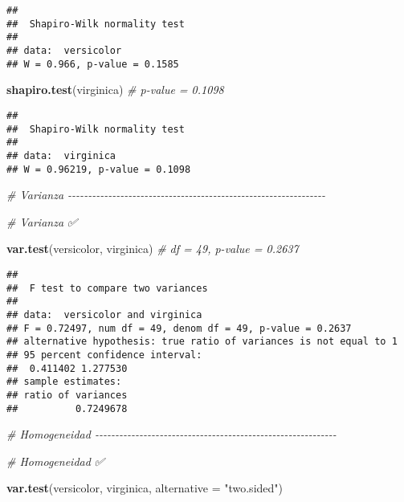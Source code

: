 \documentclass[
]{article}
\newenvironment{Shaded}{\begin{snugshade}}{\end{snugshade}}
\newcommand{\AttributeTok}[1]{\textcolor[rgb]{0.13,0.29,0.53}{#1}}
\newcommand{\CommentTok}[1]{\textcolor[rgb]{0.56,0.35,0.01}{\textit{#1}}}
\newcommand{\FunctionTok}[1]{\textcolor[rgb]{0.13,0.29,0.53}{\textbf{#1}}}
\newcommand{\NormalTok}[1]{#1}
\newcommand{\StringTok}[1]{\textcolor[rgb]{0.31,0.60,0.02}{#1}}
\begin{document}
\begin{verbatim}
## 
##  Shapiro-Wilk normality test
## 
## data:  versicolor
## W = 0.966, p-value = 0.1585
\end{verbatim}

\begin{Shaded}
\begin{Highlighting}[]
\FunctionTok{shapiro.test}\NormalTok{(virginica) }\CommentTok{\#  p{-}value = 0.1098}
\end{Highlighting}
\end{Shaded}

\begin{verbatim}
## 
##  Shapiro-Wilk normality test
## 
## data:  virginica
## W = 0.96219, p-value = 0.1098
\end{verbatim}

\begin{Shaded}
\begin{Highlighting}[]
\CommentTok{\# Varianza {-}{-}{-}{-}{-}{-}{-}{-}{-}{-}{-}{-}{-}{-}{-}{-}{-}{-}{-}{-}{-}{-}{-}{-}{-}{-}{-}{-}{-}{-}{-}{-}{-}{-}{-}{-}{-}{-}{-}{-}{-}{-}{-}{-}{-}{-}{-}{-}{-}{-}{-}{-}{-}{-}{-}{-}{-}{-}{-}{-}{-}{-}{-}{-}}

\CommentTok{\# Varianza ✅}

\FunctionTok{var.test}\NormalTok{(versicolor, virginica) }\CommentTok{\# df = 49, p{-}value = 0.2637}
\end{Highlighting}
\end{Shaded}

\begin{verbatim}
## 
##  F test to compare two variances
## 
## data:  versicolor and virginica
## F = 0.72497, num df = 49, denom df = 49, p-value = 0.2637
## alternative hypothesis: true ratio of variances is not equal to 1
## 95 percent confidence interval:
##  0.411402 1.277530
## sample estimates:
## ratio of variances 
##          0.7249678
\end{verbatim}

\begin{Shaded}
\begin{Highlighting}[]
\CommentTok{\# Homogeneidad {-}{-}{-}{-}{-}{-}{-}{-}{-}{-}{-}{-}{-}{-}{-}{-}{-}{-}{-}{-}{-}{-}{-}{-}{-}{-}{-}{-}{-}{-}{-}{-}{-}{-}{-}{-}{-}{-}{-}{-}{-}{-}{-}{-}{-}{-}{-}{-}{-}{-}{-}{-}{-}{-}{-}{-}{-}{-}{-}{-}}

\CommentTok{\# Homogeneidad ✅}

\FunctionTok{var.test}\NormalTok{(versicolor, virginica, }\AttributeTok{alternative =} \StringTok{"two.sided"}\NormalTok{)}
\end{Highlighting}
\end{Shaded}
\end{document}
